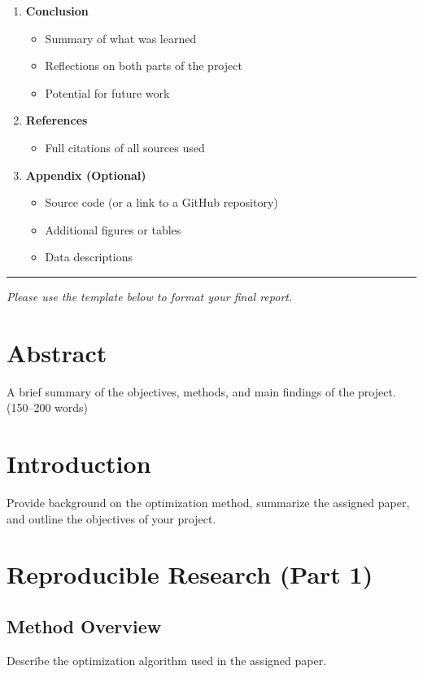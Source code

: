\documentclass[12pt]{article}
\begin{document}
\begin{enumerate}
  \item \textbf{Conclusion}
  \begin{itemize}
    \item Summary of what was learned
    \item Reflections on both parts of the project
    \item Potential for future work
  \end{itemize}

  \item \textbf{References}
  \begin{itemize}
    \item Full citations of all sources used
  \end{itemize}

  \item \textbf{Appendix (Optional)}
  \begin{itemize}
    \item Source code (or a link to a GitHub repository)
    \item Additional figures or tables
    \item Data descriptions
  \end{itemize}
\end{enumerate}

\vspace{1cm}
\hrule

\bigskip
\bigskip

\begin{center}
{\it Please use the template below to format your final report.}
\end{center}

\section*{Abstract}
A brief summary of the objectives, methods, and main findings of the project. (150--200 words)

\section{Introduction}
Provide background on the optimization method, summarize the assigned paper, and outline the objectives of your project.

\section{Reproducible Research (Part 1)}
\subsection{Method Overview}
Describe the optimization algorithm used in the assigned paper.
\end{document}
